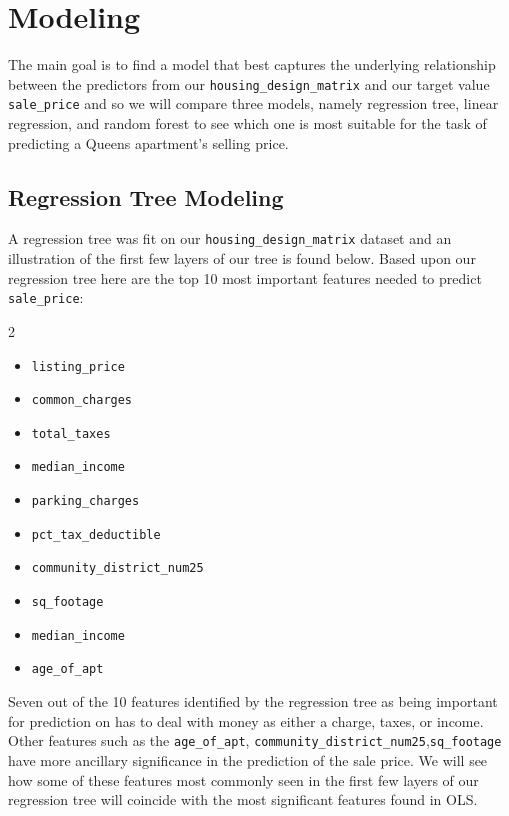 \documentclass[12pt]{article}
\begin{document}
\section{Modeling}

The main goal is to find a model that best captures the underlying relationship between the predictors from our \texttt{housing\_design\_matrix} and our target value \texttt{sale\_price} and so we will compare three models, namely regression tree, linear regression, and random forest to see which one is most suitable for the task of predicting a Queens apartment's selling price. 

\subsection{Regression Tree Modeling}
A regression tree was fit on our \texttt{housing\_design\_matrix} dataset and an illustration of the first few layers of our tree is found below. Based upon our regression tree here are the top 10 most important features needed to predict \texttt{sale\_price}: 

\begin{multicols}{2}
\begin{itemize}
\item \texttt{listing\_price}
\item \texttt{common\_charges}
\item  \texttt{total\_taxes}
\item  \texttt{median\_income}
\item  \texttt{parking\_charges}
\item  \texttt{pct\_tax\_deductible}
\item \texttt{community\_district\_num25} 
\item \texttt{sq\_footage}
\item  \texttt{median\_income}
\item  \texttt{age\_of\_apt}
\end{itemize}
\end{multicols}

Seven out of the 10 features identified by the regression tree as being important for prediction on  has to deal with money as either a charge, taxes, or income. Other features such as the \texttt{age\_of\_apt}, \texttt{community\_district\_num25},\texttt{sq\_footage} have more ancillary significance in the prediction of the sale price. We will see how some of these features most commonly seen in the first few layers of our regression tree will coincide with the most significant features found in OLS. 
\end{document}
